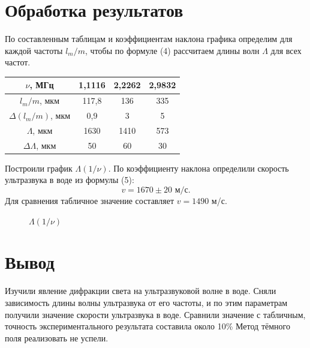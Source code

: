 \documentclass[a4paper,12pt]{article}
\begin{document}
\section*{Обработка результатов}
По составленным таблицам и коэффициентам наклона графика определим для каждой частоты $l_m/m$, чтобы по формуле (4) рассчитаем длины волн $\Lambda$ для всех частот.
	\begin{center}
	    \begin{tabular}{|c|c|c|c|}
	         \hline
	         $\nu$, МГц & 1,1116 & 2,2262 & 2,9832  \\ \hline
	         $l_m/m$, мкм & 117{,}8 & 136 & 335  \\ \hline
	         $\Delta(l_m/m)$, мкм &  0{,}9 & 3 & 5  \\ \hline
	         $\Lambda$, мкм & 1630 & 1410 & 573  \\ \hline
	         $\Delta\Lambda$, мкм & 50 & 60 & 30  \\ \hline
	    \end{tabular}
	\end{center}
Построили график $\Lambda(1/\nu)$. По коэффициенту наклона определили скорость ультразвука в воде из формулы (5):
	$$v=1670\pm20\text{ м/с}.$$
	Для сравнения табличное значение составляет $v=1490$ м/с.
	\begin{figure}[!htb] \centering
		\caption{$\Lambda(1/\nu)$}
	\end{figure}
\section*{Вывод}
	Изучили явление дифракции света на ультразвуковой волне в воде. Сняли зависимость длины волны ультразвука от его частоты, и по этим параметрам получили значение скорости ультразвука в воде. Сравнили значение с табличным, точность экспериментального результата составила около 10\% Метод тёмного поля реализовать не успели.
\end{document}
